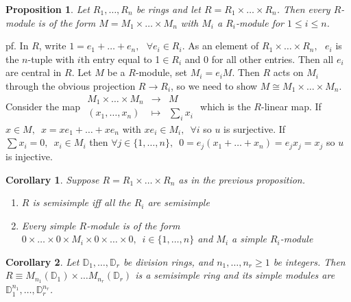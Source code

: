 \documentclass[12pt,letterpaper]{report}
\newtheorem{proposition}{Proposition}[section]
\newtheorem{corollary}{Corollary}[section]
\begin{document}
\begin{proposition}Let $R_{1},\dots,R_{n}$ be rings and let $R=R_{1}\times\dots\times R_{n}$. Then every $R$-module is of the form $M=M_{1}\times\dots\times M_{n}$ with $M_{i}$ a $R_{i}$-module for $1\leq i\leq n$.\end{proposition}
pf. In $R$, write $1=e_{1}+\dots+e_{n},\,\,\,\,\forall e_{i}\in R_{i}$. As an element of $R_{1}\times\dots\times R_{n},\,\,\,\, e_{i}$ is the $n$-tuple with $i$th entry equal to 1$\in R_{i}$ and 0 for all other entries. Then all $e_{i}$ are central in $R$. Let $M$ be a $R$-module, set $M_{i}=e_{i}M$. Then $R$ acts on $M_{i}$ through the obvious projection $R\rightarrow R_{i}$, so we need to show $M\cong M_{1}\times\dots\times M_{n}$. Consider the map $\begin{array}{rrr}M_{1}\times\dots\times M_{n}&\rightarrow&M\\(x_{1},\dots,x_{n})&\mapsto&\sum_{i}x_{i}\end{array}$ which is the $R$-linear map. If $x\in M,\,\,\,x=xe_{1}+\dots +xe_{n}$ with $xe_{i}\in M_{i},\,\,\,\forall i$ so $u$ is surjective. If $\sum x_{i}=0,\,\,\,x_{i}\in M_{i}$ then $\forall j\in\{1,\dots,n\},\,\,\,0=e_{j}(x_{1}+\dots+x_{n})=e_{j}x_{j}=x_{j}$ so $u$ is injective. 
\begin{corollary}Suppose $R=R_{1}\times\dots\times R_{n}$ as in the previous proposition.\begin{enumerate}\item $R$ is semisimple iff all the $R_{i}$ are semisimple\item Every simple $R$-module is of the form $0\times\dots\times0\times M_{i}\times0\times\dots\times0,\,\,\,i\in\{1,\dots,n\}$ and $M_{i}$ a simple $R_{i}$-module\end{enumerate}\end{corollary}\begin{corollary}Let $\mathbb{D}_{1},\dots,\mathbb{D}_{r}$ be division rings, and $n_{1},\dots,n_{r}\geq1$ be integers. Then $R\equiv M_{n_{1}}(\mathbb{D}_{1})\times\dots M_{n_{r}}(\mathbb{D}_{r})$ is a semisimple ring and its simple modules are $\mathbb{D}_{1}^{n_{1}},\dots,\mathbb{D}_{r}^{n_{r}}$.\end{corollary}
\end{document}
